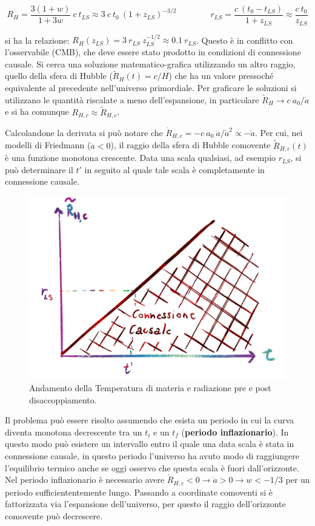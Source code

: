 \begin{equation*}
R_H = \frac{3(1+w)}{1+3w} ~c ~t_{LS} \approx  3 ~c ~t_0 ~ (1+z_{LS})^{-3/2} \qquad\qquad r_{LS} = \frac{c ~(t_0 - t_{LS})}{1+z_{LS}} \approx \frac{c ~t_0}{z_{LS}}
\end{equation*}

si ha la relazione: $R_H(z_{LS}) = 3 ~r_{LS} ~z_{LS}^{-1/2} \approx 0.1 ~r_{LS} $. Questo è in conflitto con l'osservabile (CMB), che deve essere stato prodotto in condizioni di connessione causale. Si cerca una soluzione matematico-grafica utilizzando un altro raggio, quello della sfera di Hubble ($\tilde{R}_H (t) = c/H $) che ha un valore pressoché equivalente al precedente nell'universo primordiale. Per graficare le soluzioni si utilizzano le quantità riscalate a meno dell'espansione, in particolare $\tilde{R}_H \rightarrow c ~a_0 / \dot{a}$ e si ha comunque $R_{H,c} \approx \tilde{R}_{H,c} $. 

Calcolandone la derivata si può notare che $\dot{R}_{H, c}=- c ~a_0 ~\ddot{a} / \dot{a}^2 \propto - \ddot{a}$. Per cui, nei modelli di Friedmann ($\ddot{a}<0$), il raggio della sfera di Hubble comovente $\tilde{R}_{H,c} (t)$ è una funzione monotona crescente. Data una scala qualsiasi, ad esempio $r_{LS}$, si può determinare il $t'$ in seguito al quale tale scala è completamente in connessione causale. 

\begin{figure}[h]
    \centering
    \includegraphics[width=.8\textwidth]{Pictures/4/rsferahubble-t.png}
    \caption{Andamento della Temperatura di materia e radiazione pre e post disaccoppiamento.}
    \label{fig:4}
\end{figure}

Il problema può essere risolto assumendo che esista un periodo in cui la curva diventa monotona decrescente tra un $t_i$ e un $t_f$ (\textbf{periodo inflazionario}). In questo modo può esistere un intervallo entro il quale una data scala è stata in connessione causale, in questo periodo l'universo ha avuto modo di raggiungere l'equilibrio termico anche se oggi osservo che questa scala è fuori dall'orizzonte. Nel periodo inflazionario è necessario avere $\dot{R}_{H, c}<0 \rightarrow \ddot{a}>0  \rightarrow w <-1/3$ per un periodo sufficiententemente lungo. Passando a coordinate comoventi si è fattorizzata via l'espansione dell'universo, per questo il raggio dell'orizzonte comovente può decrescere.


